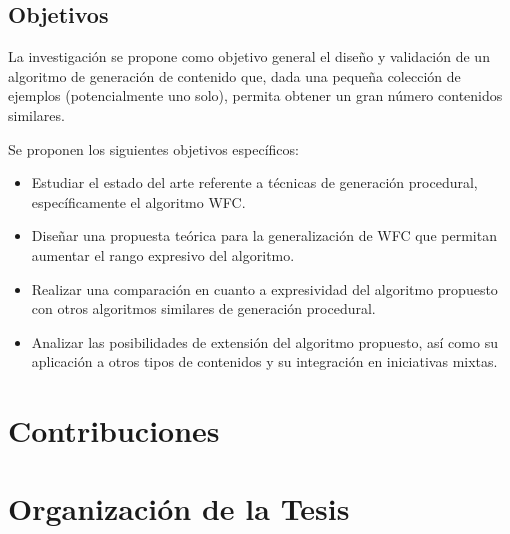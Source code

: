 \subsection*{Objetivos}

La investigación se propone como objetivo general el diseño y 
validación de un algoritmo de generación de contenido que, dada una pequeña
colección de ejemplos (potencialmente uno solo), permita obtener un gran número
contenidos similares.

Se proponen los siguientes objetivos específicos:

\begin{itemize}
    \item Estudiar el estado del arte referente a técnicas de generación 
    procedural, específicamente el algoritmo WFC.
    \item Diseñar una propuesta teórica para la generalización de
    WFC que permitan aumentar el rango expresivo del algoritmo.
    \item Realizar una comparación en cuanto a expresividad del algoritmo
    propuesto con otros algoritmos similares de generación procedural.
    \item Analizar las posibilidades de extensión del algoritmo propuesto, así
    como su aplicación a otros tipos de contenidos y su integración en iniciativas
    mixtas.            
\end{itemize}

\section*{Contribuciones}

\section*{Organización de la Tesis}

